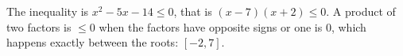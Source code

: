 The inequality is $x^2-5x-14\le0$, that is $(x-7)(x+2)\le0$. A product of two factors is $\le0$ when the factors have opposite signs or one is $0$, which happens exactly between the roots: $\boxed{[-2,7]}$.
